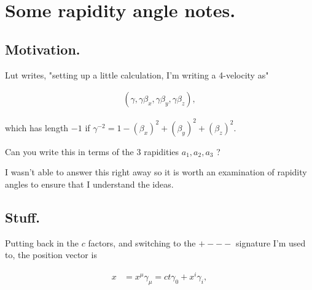 
%
%




\chapter{Some rapidity angle notes. }
\date{ Dec 18, 2008.  Last Revision: $Date: 2009/06/04 12:52:02 $ }

%


\section{Motivation. }

Lut writes, "setting up a little calculation, I'm writing a 4-velocity as"
 
\begin{align*}
( \gamma, \gamma \beta_x, \gamma \beta_y, \gamma \beta_z ),
\end{align*}
 
which has length $-1$ if $\gamma^{-2} = 1 - (\beta_x)^2+(\beta_y)^2+(\beta_z)^2$.
 
Can you write this in terms of the 3 rapidities $a_1, a_2, a_3$ ?

I wasn't able to answer this right away so it is worth an examination
of rapidity angles to ensure that I understand the ideas.

\section{Stuff. }

Putting back in the $c$ factors, and switching to the $+---$ signature I'm used to, the position
vector is

\begin{align*}
x &= x^\mu \gamma_\mu = ct \gamma_0 + x^i \gamma_i,
\end{align*}

